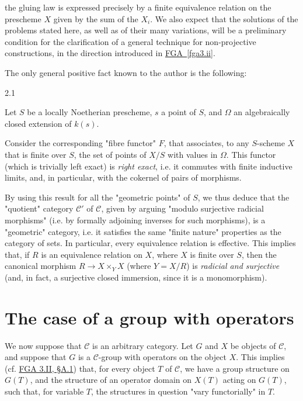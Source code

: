   the gluing law is expressed precisely by a finite equivalence relation on the prescheme \(X\) given by the sum of the \(X_i\).
  We also expect that the solutions of the problems stated here, as well as of their many variations, will be a preliminary condition for the clarification of a general technique for non-projective constructions, in the direction introduced in \hyperref[fga3.ii]{FGA~\ref*{fga3.ii}}.\par{}The only general positive fact known to the author is the following:\begin{proposition}{2.1}\label{fga3.iii-2-proposition-2.1}\skipsinglepar\par{}Let \(S\) be a locally Noetherian prescheme, \(s\) a point of \(S\), and \(\Omega \) an algebraically closed extension of \(k(s)\).
    
    Consider the corresponding "fibre functor" \(F\), that associates, to any \(S\)-scheme \(X\) that is finite over \(S\), the set of points of \(X/S\) with values in \(\Omega \).
    This functor (which is trivially left exact) is \emph{right exact}, i.e. it commutes with finite inductive limits, and, in particular, with the cokernel of pairs of morphisms.\end{proposition}\par{}By using this result for all the "geometric points" of \(S\), we thus deduce that the "quotient" category \(\mathcal {C}'\) of \(\mathcal {C}\), given by arguing "modulo surjective radicial morphisms" (i.e. by formally adjoining inverses for such morphisms), is a "geometric" category, i.e. it satisfies the same "finite nature" properties as the category of sets.
  In particular, every equivalence relation is effective.
  This implies that, if \(R\) is an equivalence relation on \(X\), where \(X\) is finite over \(S\), then the canonical morphism \(R\to  X\times _Y X\) (where \(Y=X/R\)) is \emph{radicial and surjective} (and, in fact, a surjective closed immersion, since it is a monomorphism).\chapter{The case of a group with operators}\thispagestyle{fancy}\label{fga3.iii-3}\par{}We now suppose that \(\mathcal {C}\) is an arbitrary category.
  Let \(G\) and \(X\) be objects of \(\mathcal {C}\), and suppose that \(G\) is a \(\mathcal {C}\)-group with operators on the object \(X\).
  This implies (cf. \hyperref[fga3.ii-a.1]{FGA 3.II, §A.1}) that, for every object \(T\) of \(\mathcal {C}\), we have a group structure on \(G(T)\), and the structure of an operator domain on \(X(T)\) acting on \(G(T)\), such that, for variable \(T\), the structures in question "vary functorially" in \(T\).
